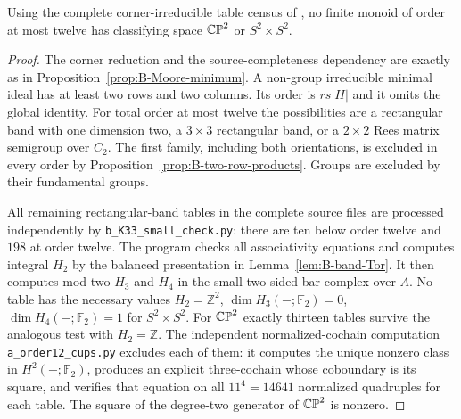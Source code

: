 \begin{proposition}
\label{prop:B-fourdim-lower}
Using the complete corner-irreducible table census of
\cite{SweeneyEnumeration2026B}, no finite monoid of order at most
twelve has classifying space $\mathbb {CP}^2$ or $S^2\times S^2$.
\end{proposition}
\begin{proof}
The corner reduction and the source-completeness dependency are exactly
as in Proposition~\ref{prop:B-Moore-minimum}.  A non-group irreducible
minimal ideal has at least two rows and two columns.  Its order is
$r s |H|$ and it omits the global identity.  For total order at most
twelve the possibilities are a rectangular band with one dimension
two, a $3\times3$ rectangular band, or a $2\times2$ Rees matrix
semigroup over $C_2$.  The first family, including both orientations,
is excluded in every order by Proposition~\ref{prop:B-two-row-products}.
Groups are excluded by their fundamental groups.

All remaining rectangular-band tables in the complete source files
are processed independently by \texttt{b\_K33\_small\_check.py}:
there are ten below order twelve and $198$ at order twelve.
The program checks all associativity equations and computes integral
$H_2$ by the balanced presentation in Lemma~\ref{lem:B-band-Tor}.
It then computes mod-two $H_3$ and $H_4$ in the small two-sided bar
complex over $A$.  No table has the necessary values
$H_2=\mathbb Z^2$, $\dim H_3(-;\mathbb F_2)=0$,
$\dim H_4(-;\mathbb F_2)=1$ for $S^2\times S^2$.
For $\mathbb {CP}^2$ exactly thirteen tables survive the analogous test with
$H_2=\mathbb Z$.  The independent normalized-cochain computation
\texttt{a\_order12\_cups.py} excludes each of them: it computes
the unique nonzero class in $H^2(-;\mathbb F_2)$, produces an
explicit three-cochain whose coboundary is its square, and verifies
that equation on all $11^4=14641$ normalized quadruples for each
table.  The square of the degree-two generator of $\mathbb {CP}^2$ is nonzero.


\end{proof}
